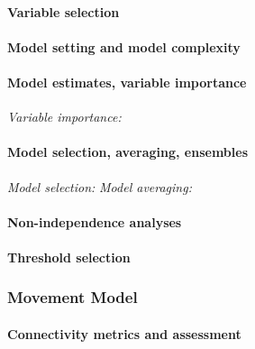 \documentclass[11pt, a4paper]{article}
\begin{document}
\hypertarget{variable-selection}{%
\paragraph{Variable selection}\label{variable-selection}}

\hypertarget{model-setting-and-model-complexity}{%
\paragraph{Model setting and model
complexity}\label{model-setting-and-model-complexity}}

\hypertarget{model-estimates-variable-importance}{%
\paragraph{Model estimates, variable
importance}\label{model-estimates-variable-importance}}

\emph{Variable importance:}

\hypertarget{model-selection-averaging-ensembles}{%
\paragraph{Model selection, averaging,
ensembles}\label{model-selection-averaging-ensembles}}

\emph{Model selection:} \emph{Model averaging:}

\hypertarget{non-independence-analyses}{%
\paragraph{Non-independence analyses}\label{non-independence-analyses}}

\hypertarget{threshold-selection}{%
\paragraph{Threshold selection}\label{threshold-selection}}

\hypertarget{movement-model}{%
\subsubsection{Movement Model}\label{movement-model}}

\hypertarget{connectivity-metrics-and-assessment}{%
\paragraph{Connectivity metrics and
assessment}\label{connectivity-metrics-and-assessment}}
\end{document}
